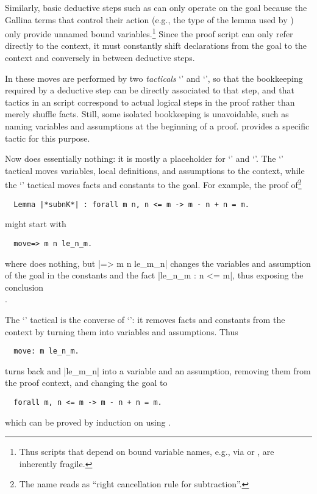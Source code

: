 Similarly, basic deductive steps such as  can only operate on
the goal because the Gallina terms that control their action (e.g.,
the type of the lemma used by ) only provide unnamed bound
variables.\footnote{Thus scripts that depend on bound variable names, e.g.,
via  or , are inherently fragile.}  Since the proof
script can only refer directly to the context, it must constantly
shift declarations from the goal to the context and conversely in
between deductive steps.

In \ssr{} these moves are performed by two \emph{tacticals} `\ssrC{=>}'
and `\ssrC{:}', so that the bookkeeping required by a deductive step can
be directly associated to that step, and that tactics in an \ssr{}
script correspond to actual logical steps in the proof rather than
merely shuffle facts. Still, some isolated bookkeeping is unavoidable,
such as naming variables and assumptions at the beginning of a proof.
\ssr{} provides a specific  tactic for this purpose.

Now  does essentially nothing: it is mostly a placeholder for
`\ssrC{=>}' and `\ssrC{:}'. The `\ssrC{=>}' tactical moves variables, local
definitions, and assumptions to the context, while the `\ssrC{:}'
tactical moves facts and constants to the goal. For example, the proof
of\footnote{The name  reads as
``right cancellation rule for  subtraction''.}
\begin{lstlisting}
  Lemma |*subnK*| : forall m n, n <= m -> m - n + n = m.
\end{lstlisting}\noindent
might start with
\begin{lstlisting}
  move=> m n le_n_m.
\end{lstlisting}
where  does nothing, but \ssrL|=> m n le_m_n| changes the
variables and assumption of the goal in the constants 
and the fact \ssrL|le_n_m : n <= m|, thus exposing the conclusion\\
 . 

The `\ssrC{:}' tactical is the converse of `\ssrC{=>}': it removes facts
and constants from the context by turning them into variables and assumptions.
Thus
\begin{lstlisting}
  move: m le_n_m.
\end{lstlisting}
turns back  and \ssrL|le_m_n| into a variable and an assumption, removing
them from the proof context, and changing the goal to
\begin{lstlisting}
  forall m, n <= m -> m - n + n = m.
\end{lstlisting}
which can be proved by induction on  using .

